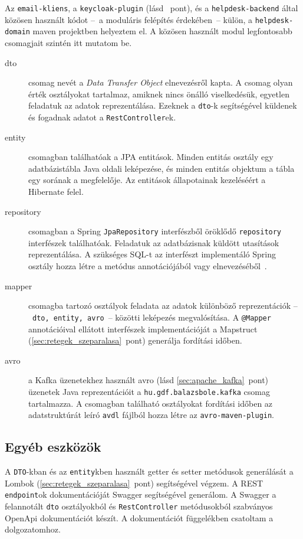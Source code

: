 Az \texttt{email-kliens}, a \texttt{keycloak-plugin} (lásd ~pont), és a \texttt{helpdesk-backend} által közösen használt kódot --~a moduláris felépítés érdekében~-- külön, a \texttt{helpdesk-domain} maven projektben helyeztem el. A közösen használt modul legfontosabb csomagjait szintén itt mutatom be.


\begin{description}
	\item[dto] csomag nevét a \emph{Data Transfer Object} elnevezésről kapta. A csomag olyan érték osztályokat tartalmaz, amiknek nincs önálló viselkedésük, egyetlen feladatuk az adatok reprezentálása. Ezeknek a \texttt{dto}-k segítségével küldenek és fogadnak adatot a \texttt{RestController}ek.

	\item[entity] csomagban találhatóak a JPA entitások. Minden entitás osztály egy adatbázistábla Java oldali leképezése, és minden entitás objektum a tábla egy sorának a megfelelője. Az entitások állapotainak kezeléséért a Hibernate felel.
	
	\item[repository] csomagban a Spring \texttt{JpaRepository} interfészből öröklődő \texttt{repository} interfészek találhatóak. Feladatuk az adatbázisnak küldött utasítások reprezentálása. A szükséges SQL-t az interfészt implementáló Spring osztály hozza létre a metódus annotációjából vagy elnevezéséből~\cite{spring_boot_Query_Creation}.
	
	\item[mapper] csomagba tartozó osztályok feladata az adatok különböző reprezentációk --~\texttt{dto, entity, avro}~-- közötti leképezés megvalósítása. A \texttt{@Mapper} annotációival ellátott interfészek implementációját a Mapstruct (\ref{sec:retegek_szeparalasa}~pont) generálja fordítási időben.
	
	\item[avro] a Kafka üzenetekhez használt avro (lásd \ref{sec:apache_kafka}~pont) üzenetek Java reprezentációit a \texttt{hu.gdf.balazsbole.kafka} csomag tartalmazza. A csomagban található osztályokat fordítási időben az adatstruktúrát leíró \texttt{avdl} fájlból hozza létre az \texttt{avro-maven-plugin}.
\end{description}


\subsection{Egyéb eszközök}\label{sec:backend_egyeb_eszkozok}
A \texttt{DTO}-kban és az \texttt{entity}kben használt getter és setter  metódusok generálását a Lombok (\ref{sec:retegek_szeparalasa}~pont) segítségével végzem. A REST \texttt{endpoint}ok dokumentációját Swagger segítségével generálom. A Swagger a felannotált \texttt{dto} osztályokból és \texttt{RestController} metódusokból szabványos OpenApi dokumentációt készít. A dokumentációt  függelékben csatoltam a dolgozatomhoz.



